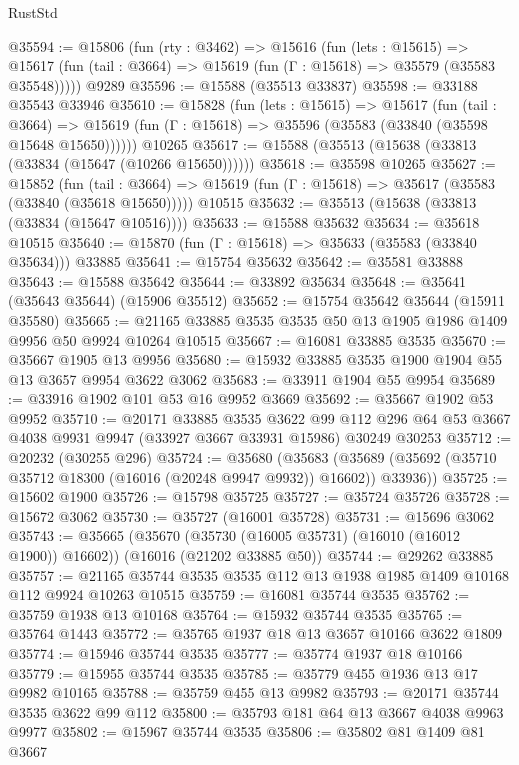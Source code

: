 \begin{lexlean}{RustStd}
\begin{coremodule}
@35594 := @15806
    (fun (rty : @3462) =>
    @15616
      (fun (lets : @15615) =>
      @15617 (fun (tail : @3664) => @15619 (fun (Γ : @15618) => @35579 (@35583 @35548)))))
    @9289
@35596 := @15588 (@35513 @33837)
@35598 := @33188 @35543 @33946
@35610 := @15828
    (fun (lets : @15615) =>
    @15617
      (fun (tail : @3664) =>
      @15619 (fun (Γ : @15618) => @35596 (@35583 (@33840 (@35598 @15648 @15650))))))
    @10265
@35617 := @15588 (@35513 (@15638 (@33813 (@33834 (@15647 (@10266 @15650))))))
@35618 := @35598 @10265
@35627 := @15852
    (fun (tail : @3664) => @15619 (fun (Γ : @15618) => @35617 (@35583 (@33840 (@35618 @15650)))))
    @10515
@35632 := @35513 (@15638 (@33813 (@33834 (@15647 @10516))))
@35633 := @15588 @35632
@35634 := @35618 @10515
@35640 := @15870 (fun (Γ : @15618) => @35633 (@35583 (@33840 @35634))) @33885
@35641 := @15754 @35632
@35642 := @35581 @33888
@35643 := @15588 @35642
@35644 := @33892 @35634
@35648 := @35641 (@35643 @35644) (@15906 @35512)
@35652 := @15754 @35642 @35644 (@15911 @35580)
@35665 := @21165 @33885 @3535 @3535 @50 @13 @1905 @1986 @1409 @9956 @50 @9924 @10264 @10515
@35667 := @16081 @33885 @3535
@35670 := @35667 @1905 @13 @9956
@35680 := @15932 @33885 @3535 @1900 @1904 @55 @13 @3657 @9954 @3622 @3062
@35683 := @33911 @1904 @55 @9954
@35689 := @33916 @1902 @101 @53 @16 @9952 @3669
@35692 := @35667 @1902 @53 @9952
@35710 := @20171
    @33885
    @3535
    @3622
    @99
    @112
    @296
    @64
    @53
    @3667
    @4038
    @9931
    @9947
    (@33927 @3667 @33931 @15986)
    @30249
    @30253
@35712 := @20232 (@30255 @296)
@35724 := @35680
    (@35683 (@35689 (@35692 (@35710 @35712 @18300 (@16016 (@20248 @9947 @9932)) @16602)) @33936))
@35725 := @15602 @1900
@35726 := @15798 @35725
@35727 := @35724 @35726
@35728 := @15672 @3062
@35730 := @35727 (@16001 @35728)
@35731 := @15696 @3062
@35743 := @35665
    (@35670 (@35730 (@16005 @35731) (@16010 (@16012 @1900)) @16602))
    (@16016 (@21202 @33885 @50))
@35744 := @29262 @33885
@35757 := @21165 @35744 @3535 @3535 @112 @13 @1938 @1985 @1409 @10168 @112 @9924 @10263 @10515
@35759 := @16081 @35744 @3535
@35762 := @35759 @1938 @13 @10168
@35764 := @15932 @35744 @3535
@35765 := @35764 @1443
@35772 := @35765 @1937 @18 @13 @3657 @10166 @3622 @1809
@35774 := @15946 @35744 @3535
@35777 := @35774 @1937 @18 @10166
@35779 := @15955 @35744 @3535
@35785 := @35779 @455 @1936 @13 @17 @9982 @10165
@35788 := @35759 @455 @13 @9982
@35793 := @20171 @35744 @3535 @3622 @99 @112
@35800 := @35793 @181 @64 @13 @3667 @4038 @9963 @9977
@35802 := @15967 @35744 @3535
@35806 := @35802 @81 @1409 @81 @3667

\end{coremodule}
\end{lexlean}
